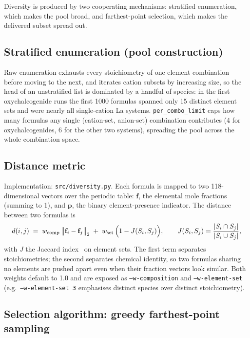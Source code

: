 \documentclass[11pt,a4paper]{article}
\newcommand{\pkg}[1]{\texttt{#1}}
\newcommand{\code}[1]{\texttt{#1}}
\newcommand{\cmd}[1]{\texttt{\small #1}}
\begin{document}
Diversity is produced by two cooperating mechanisms: stratified enumeration, which makes the pool
broad, and farthest-point selection, which makes the delivered subset spread out.

\subsection{Stratified enumeration (pool construction)}
\label{sec:strat}

Raw enumeration exhausts every stoichiometry of one element combination before moving to the next,
and iterates cation subsets by increasing size, so the head of an unstratified list is dominated by
a handful of species: in the first oxychalcogenide runs the first 1000 formulas spanned only 15
distinct element sets and were nearly all single-cation La systems. \code{per\_combo\_limit} caps
how many formulas any single (cation-set, anion-set) combination contributes (4 for
oxychalcogenides, 6 for the other two systems), spreading the pool across the whole combination
space.

\subsection{Distance metric}

Implementation: \pkg{src/diversity.py}. Each formula is mapped to two 118-dimensional vectors over
the periodic table: $\mathbf{f}$, the elemental mole fractions (summing to 1), and $\mathbf{p}$,
the binary element-presence indicator. The distance between two formulas is
\begin{equation}
  d(i,j) \;=\; w_{\text{comp}}\,\bigl\lVert \mathbf{f}_i - \mathbf{f}_j \bigr\rVert_2
           \;+\; w_{\text{set}}\,\Bigl(1 - J(S_i,S_j)\Bigr),
  \qquad
  J(S_i,S_j) = \frac{|S_i \cap S_j|}{|S_i \cup S_j|},
  \label{eq:distance}
\end{equation}
with $J$ the Jaccard index~\cite{jaccard} on element sets. The first term separates
stoichiometries; the second separates chemical identity, so two formulas sharing no elements are
pushed apart even when their fraction vectors look similar. Both weights default to 1.0 and are
exposed as \cmd{--w-composition} and \cmd{--w-element-set} (e.g.\ \cmd{--w-element-set 3}
emphasises distinct species over distinct stoichiometry).

\subsection{Selection algorithm: greedy farthest-point sampling}
\end{document}
